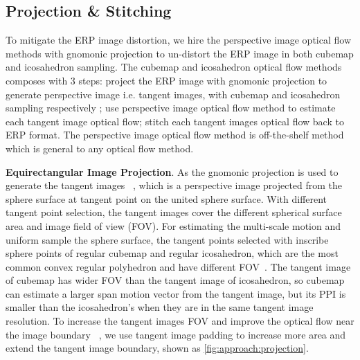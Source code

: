 \subsection{Projection \& Stitching}
\label{sec:approach:projstit}

To mitigate the ERP image distortion, we hire the perspective image optical flow methods with gnomonic projection to un-distort the ERP image in both cubemap and icosahedron sampling.
The cubemap and icosahedron optical flow methods composes with 3 steps:
project the ERP image with gnomonic projection \cite{?} to generate perspective image i.e. tangent images, with cubemap and icosahedron sampling respectively \cite{?}\cite{?};
use perspective image optical flow method to estimate each tangent image optical flow;
stitch each tangent images optical flow back to ERP format.
The perspective image optical flow method is off-the-shelf method which is general to any optical flow method.

\textbf{Equirectangular Image Projection}.
As \cite{ZhaoYZLBT2020} the gnomonic projection is used to generate the tangent images ~\cite{??}, which is a perspective image projected from the sphere surface at tangent point on the united sphere surface.
With different tangent point selection, the tangent images cover the different spherical surface area and image field of view (FOV).
%
For estimating the multi-scale motion and uniform sample the sphere surface, the tangent points selected with inscribe sphere points of regular cubemap and regular icosahedron, which are the most common convex regular polyhedron and have different FOV~\cite{?}.
%
The tangent image of cubemap has wider FOV than the tangent image of icosahedron, so cubemap can estimate a larger span motion vector from the tangent image, but its PPI is smaller than the icosahedron's when they are in the same tangent image resolution.
To increase the tangent images FOV and improve the optical flow near the image boundary ~\cite{?}, we use tangent image padding to increase more area and extend the tangent image boundary, shown as \cref{fig:approach:projection}.

